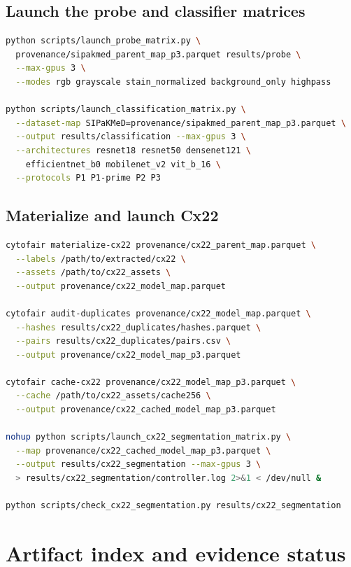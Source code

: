 \documentclass[11pt,oneside]{report}
\begin{document}
\section{Launch the probe and classifier matrices}

\begin{lstlisting}[style=cyto,language=bash]
python scripts/launch_probe_matrix.py \
  provenance/sipakmed_parent_map_p3.parquet results/probe \
  --max-gpus 3 \
  --modes rgb grayscale stain_normalized background_only highpass

python scripts/launch_classification_matrix.py \
  --dataset-map SIPaKMeD=provenance/sipakmed_parent_map_p3.parquet \
  --output results/classification --max-gpus 3 \
  --architectures resnet18 resnet50 densenet121 \
    efficientnet_b0 mobilenet_v2 vit_b_16 \
  --protocols P1 P1-prime P2 P3
\end{lstlisting}

\section{Materialize and launch Cx22}

\begin{lstlisting}[style=cyto,language=bash]
cytofair materialize-cx22 provenance/cx22_parent_map.parquet \
  --labels /path/to/extracted/cx22 \
  --assets /path/to/cx22_assets \
  --output provenance/cx22_model_map.parquet

cytofair audit-duplicates provenance/cx22_model_map.parquet \
  --hashes results/cx22_duplicates/hashes.parquet \
  --pairs results/cx22_duplicates/pairs.csv \
  --output provenance/cx22_model_map_p3.parquet

cytofair cache-cx22 provenance/cx22_model_map_p3.parquet \
  --cache /path/to/cx22_assets/cache256 \
  --output provenance/cx22_cached_model_map_p3.parquet

nohup python scripts/launch_cx22_segmentation_matrix.py \
  --map provenance/cx22_cached_model_map_p3.parquet \
  --output results/cx22_segmentation --max-gpus 3 \
  > results/cx22_segmentation/controller.log 2>&1 < /dev/null &

python scripts/check_cx22_segmentation.py results/cx22_segmentation
\end{lstlisting}

\chapter{Artifact index and evidence status}
\end{document}
